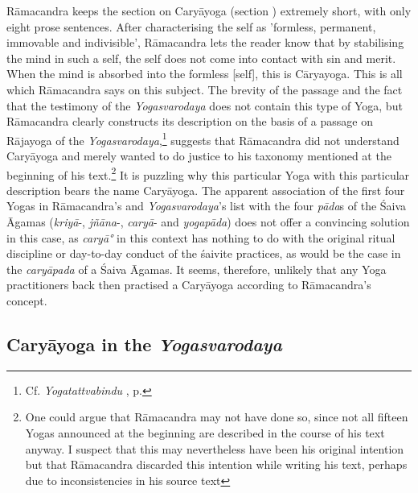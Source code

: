 Rāmacandra keeps the section on Caryāyoga (section ) extremely short, with only eight prose sentences. After characterising the self as 'formless, permanent, immovable and indivisible', Rāmacandra lets the reader know that by stabilising the mind in such a self, the self does not come into contact with sin and merit. When the mind is absorbed into the formless [self], this is Cāryayoga. This is all which Rāmacandra says on this subject. The brevity of the passage and the fact that the testimony of the \textit{Yogasvarodaya} does not contain this type of Yoga, but Rāmacandra clearly constructs its description on the basis of a passage on Rājayoga of the \textit{Yogasvarodaya},\footnote{Cf. \textit{Yogatattvabindu} , p. \pageref{caryayoga}} suggests that Rāmacandra did not understand Caryāyoga and merely wanted to do justice to his taxonomy mentioned at the beginning of his text.\footnote{One could argue that Rāmacandra may not have done so, since not all fifteen Yogas announced at the beginning are described in the course of his text anyway. I suspect that this may nevertheless have been his original intention but that Rāmacandra discarded this intention while writing his text, perhaps due to inconsistencies in his source text} It is puzzling why this particular Yoga with this particular description bears the name Caryāyoga. The apparent association of the first four Yogas in Rāmacandra's and \textit{Yogasvarodaya}'s list with the four \textit{pāda}s of the Śaiva Āgamas (\textit{kriyā}-, \textit{jñāna}-, \textit{caryā}- and \textit{yogapāda}) does not offer a convincing solution in this case, as \textit{caryā°} in this context has nothing to do with the original ritual discipline or day-to-day conduct of the śaivite practices, as would be the case in the \textit{caryāpada} of a Śaiva Āgamas. It seems, therefore, unlikely that any Yoga practitioners back then practised a Caryāyoga according to Rāmacandra's concept. 

\subsection{Caryāyoga in the \textit{Yogasvarodaya}}

